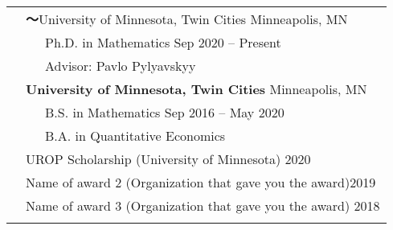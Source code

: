 \documentclass[letterpaper, 11pt, utf8, AutoFakeBold]{ctexart}
\newcommand{\mycolor}[0]{\color{RoyalBlue}}
\begin{document}
\begin{longtable}{p{1.5in}p{4.9in}}
\mycolor{Education} 
& \textbf～{University of Minnesota, Twin Cities} \hfill Minneapolis, MN \\ 
&\ \ \ Ph.D. in Mathematics \hfill Sep 2020 -- Present \\
&\ \ \ Advisor: Pavlo Pylyavskyy\\ 
& \textbf{University of Minnesota, Twin Cities} \hfill Minneapolis, MN \\ 
&\ \ \ B.S. in Mathematics \hfill Sep 2016 -- May 2020\\
&\ \ \ B.A. in Quantitative Economics %
\\

\begin{comment}
{\mycolor{Awards and}} 
& UROP Scholarship (University of Minnesota) \hfill 2020\\
{\mycolor{scholarships}} 
& Name of award 2 (Organization that gave you the award)\hfill 2019 \\
& Name of award 3 (Organization that gave you the award) \hfill 2018 \\
\end{comment}
& \\




\end{longtable}
\end{document}
